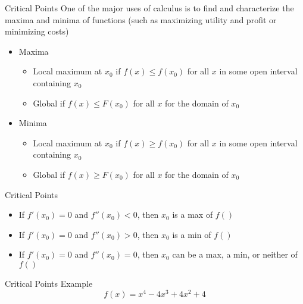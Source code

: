 \documentclass[aspectratio=169]{beamer}
\begin{document}
\begin{frame}{Critical Points}\label{main1}
    One of the major uses of calculus is to find and characterize the maxima and minima of functions (such as maximizing utility and profit or minimizing costs)
    \begin{itemize}
    \item Maxima
    \begin{itemize}
        \item Local maximum at $x_0$ if $f(x) \leq f(x_0)$ for all $x$ in some open interval containing $x_0$ 
        \item Global if $f(x) \leq F(x_0)$ for all $x$ for the domain of $x_0$ 
    \end{itemize}
    \item Minima
   \begin{itemize}
        \item Local maximum at $x_0$ if $f(x) \geq f(x_0)$ for all $x$ in some open interval containing $x_0$ 
        \item Global if $f(x) \geq F(x_0)$ for all $x$ for the domain of $x_0$ 
    \end{itemize}
    \end{itemize}
\end{frame}

\begin{frame}{Critical Points}\label{main1}
    \begin{itemize}
    \begin{itemize}
        \item If $f'(x_0) = 0$ and $f''(x_0) < 0$, then $x_0$ is a max of $f()$
        \item If $f'(x_0) = 0$ and $f''(x_0) > 0$, then $x_0$ is a min of $f()$
        \item If $f'(x_0) = 0$ and $f''(x_0) = 0$, then $x_0$ can be a max, a min, or neither of $f()$
    \end{itemize}
    \end{itemize}
\end{frame}

\begin{frame}{Critical Points Example}\label{main1}
	\vspace{-4cm}
     \[
    f(x) = x^4 - 4x^3 + 4x^2 + 4
    \]
\end{frame}
\end{document}
